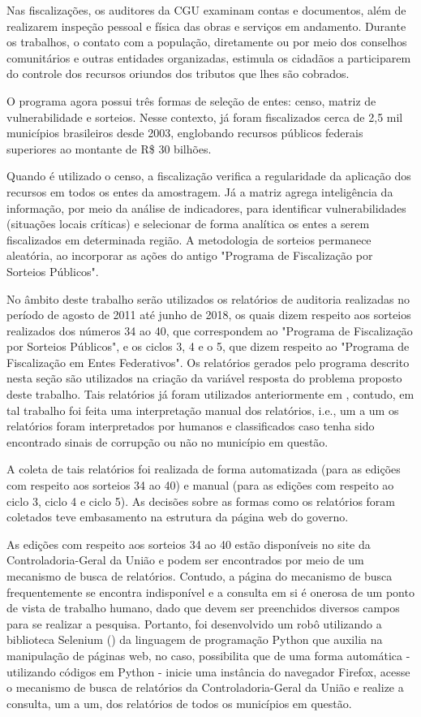 Nas fiscalizações, os auditores da CGU examinam contas e documentos, além de realizarem inspeção pessoal e física das obras e serviços em andamento. Durante os trabalhos, o contato com a população, diretamente ou por meio dos conselhos comunitários e outras entidades organizadas, estimula os cidadãos a participarem do controle dos recursos oriundos dos tributos que lhes são cobrados.

O programa agora possui três formas de seleção de entes: censo, matriz de vulnerabilidade e sorteios. Nesse contexto, já foram fiscalizados cerca de 2,5 mil municípios brasileiros desde 2003, englobando recursos públicos federais superiores ao montante de R\$ 30 bilhões.

Quando é utilizado o censo, a fiscalização verifica a regularidade da aplicação dos recursos em todos os entes da amostragem. Já a matriz agrega inteligência da informação, por meio da análise de indicadores, para identificar vulnerabilidades (situações locais críticas) e selecionar de forma analítica os entes a serem fiscalizados em determinada região. A metodologia de sorteios permanece aleatória, ao incorporar as ações do antigo "Programa de Fiscalização por Sorteios Públicos".

No âmbito deste trabalho serão utilizados os relatórios de auditoria realizadas no período de agosto de 2011 até junho de 2018, os quais dizem respeito aos sorteios realizados dos números 34 ao 40, que correspondem ao "Programa de Fiscalização por Sorteios Públicos", e os ciclos 3, 4 e o 5, que dizem respeito ao "Programa de Fiscalização em Entes Federativos". Os relatórios gerados pelo programa descrito nesta seção são utilizados na criação da variável resposta do problema proposto deste trabalho. Tais relatórios já foram utilizados anteriormente em \citet{FerrazFinan2008}, contudo, em tal trabalho foi feita uma interpretação manual dos relatórios, i.e., um a um os relatórios foram interpretados por humanos e classificados caso tenha sido encontrado sinais de corrupção ou não no município em questão.

A coleta de tais relatórios foi realizada de forma automatizada (para as edições com respeito aos sorteios 34 ao 40) e manual (para as edições com respeito ao ciclo 3, ciclo 4 e ciclo 5). As decisões sobre as formas como os relatórios foram coletados teve embasamento na estrutura da página web do governo.

As edições com respeito aos sorteios 34 ao 40 estão disponíveis no site da Controladoria-Geral da União e podem ser encontrados por meio de um mecanismo de busca de relatórios. Contudo, a página do mecanismo de busca frequentemente se encontra indisponível e a consulta em si é onerosa de um ponto de vista de trabalho humano, dado que devem ser preenchidos diversos campos para se realizar a pesquisa. Portanto, foi desenvolvido um robô utilizando a biblioteca Selenium (\citet{Selenium}) da linguagem de programação Python que auxilia na manipulação de páginas web, no caso, possibilita que de uma forma automática - utilizando códigos em Python - inicie uma instância do navegador Firefox, acesse o mecanismo de busca de relatórios da Controladoria-Geral da União e realize a consulta, um a um, dos relatórios de todos os municípios em questão.

